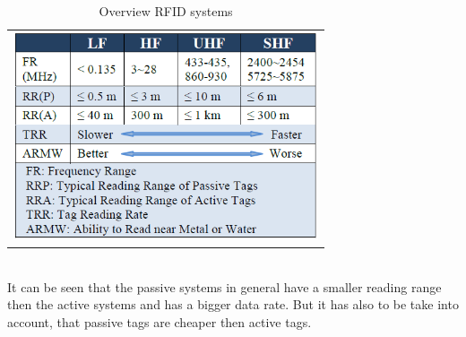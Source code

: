 \begin{table}[!htbp]
\centering
\begin{tabular}{c}
\includegraphics[width = 9cm]{Pictures/RFID_Systems}
\end{tabular}
\caption{Overview RFID systems}
\label{RFID_Systems}
\end{table}\\
It can be seen that the passive systems in general have a smaller reading range then the active systems and has a bigger data rate. But it has also to be take into account, that passive tags are cheaper then active tags.   
